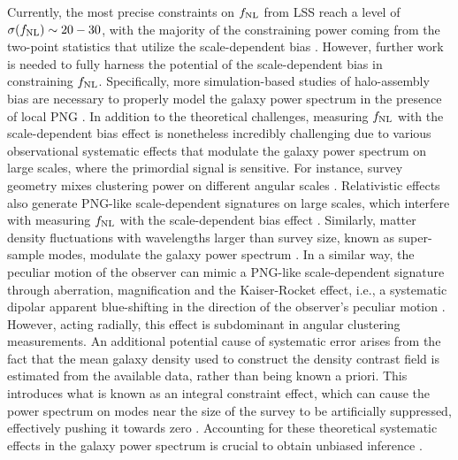Currently, the most precise constraints on $f_{\rm NL}$ from LSS reach a level of $\sigma(f_{\rm NL}) \sim 20-30$, with the majority of the constraining power coming from the two-point statistics that utilize the scale-dependent bias \citep{2019JCAP...09..010C, mueller2022primordial, 2022PhRvD.106d3506C, 2022arXiv220111518D}. However, further work is needed to fully harness the potential of the scale-dependent bias in constraining $f_{\rm NL}$. Specifically, more simulation-based studies of halo-assembly bias are necessary to properly model the galaxy power spectrum in the presence of local PNG \citep{2020JCAP...12..013B, 2020JCAP...12..031B, 2022JCAP...11..013B, 2023JCAP...01..023L}. In addition to the theoretical challenges, measuring $f_{\rm NL}$ with the scale-dependent bias effect is nonetheless incredibly challenging due to various observational systematic effects that modulate the galaxy power spectrum on large scales, where the primordial signal is sensitive. For instance, survey geometry mixes clustering power on different angular scales \citep{beutler2014clustering,wilson2017rapid}. Relativistic effects also generate PNG-like scale-dependent signatures on large scales, which interfere with measuring $f_{\rm NL}$ with the scale-dependent bias effect \citep{wang2020}. Similarly, matter density fluctuations with wavelengths larger than survey size, known as super-sample modes, modulate the galaxy power spectrum \citep{castorina2020JCAP}. In a similar way, the peculiar motion of the observer can mimic a PNG-like scale-dependent signature through aberration, magnification and the Kaiser-Rocket effect, i.e., a systematic dipolar apparent blue-shifting in the direction of the observer's peculiar motion \citep{2021JCAP...11..027B}. However, acting radially, this effect is subdominant in angular clustering measurements. An additional potential cause of systematic error arises from the fact that the mean galaxy density used to construct the density contrast field is estimated from the available data, rather than being known a priori. This introduces what is known as an integral constraint effect, which can cause the power spectrum on modes near the size of the survey to be artificially suppressed, effectively pushing it towards zero \citep{peacock1991large,de2019integral}. Accounting for these theoretical systematic effects in the galaxy power spectrum is crucial to obtain unbiased inference \citep[see, e.g.,][]{riquelme2022primordial}. 

